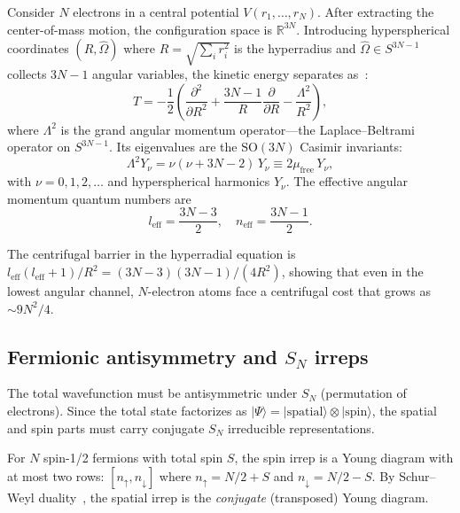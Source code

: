 \documentclass[aps,prl,twocolumn,superscriptaddress,longbibliography]{revtex4-2}
\newcommand{\mufree}{\mu_{\mathrm{free}}}
\newcommand{\neff}{n_{\mathrm{eff}}}
\newcommand{\leff}{l_{\mathrm{eff}}}
\begin{document}
Consider $N$ electrons in a central potential $V(r_1, \ldots, r_N)$.
After extracting the center-of-mass motion, the configuration space is
$\mathbb{R}^{3N}$.  Introducing hyperspherical coordinates
$(R, \hat{\Omega})$ where $R = \sqrt{\sum_i r_i^2}$ is the
hyperradius and $\hat{\Omega} \in S^{3N-1}$ collects $3N-1$ angular
variables, the kinetic energy separates as~\cite{Avery2000,
Fock1954}:
\begin{equation}
  T = -\frac{1}{2}\left(\frac{\partial^2}{\partial R^2}
    + \frac{3N-1}{R}\frac{\partial}{\partial R}
    - \frac{\Lambda^2}{R^2}\right),
  \label{eq:kinetic}
\end{equation}
where $\Lambda^2$ is the grand angular momentum operator---the
Laplace--Beltrami operator on $S^{3N-1}$.  Its eigenvalues are the
$\mathrm{SO}(3N)$ Casimir invariants:
\begin{equation}
  \Lambda^2 Y_\nu = \nu(\nu + 3N - 2)\, Y_\nu \equiv 2\mufree\, Y_\nu,
  \label{eq:casimir}
\end{equation}
with $\nu = 0, 1, 2, \ldots$ and hyperspherical harmonics $Y_\nu$.
The effective angular momentum quantum numbers are
\begin{equation}
  \leff = \frac{3N - 3}{2}, \quad \neff = \frac{3N - 1}{2}.
  \label{eq:eff_qn}
\end{equation}

The centrifugal barrier in the hyperradial equation is
$\leff(\leff + 1)/R^2 = (3N-3)(3N-1)/(4R^2)$, showing that even in
the lowest angular channel, $N$-electron atoms face a centrifugal cost
that grows as $\sim 9N^2/4$.

\subsection{Fermionic antisymmetry and $S_N$ irreps}
\label{sec:sn_irreps}

The total wavefunction must be antisymmetric under $S_N$ (permutation
of electrons).  Since the total state factorizes as $|\Psi\rangle =
|\text{spatial}\rangle \otimes |\text{spin}\rangle$, the spatial and
spin parts must carry conjugate $S_N$ irreducible representations.

For $N$ spin-1/2 fermions with total spin $S$, the spin irrep is a
Young diagram with at most two rows: $[n_\uparrow, n_\downarrow]$
where $n_\uparrow = N/2 + S$ and $n_\downarrow = N/2 - S$.  By
Schur--Weyl duality~\cite{Weyl1946, FultonHarris1991}, the spatial
irrep is the \emph{conjugate} (transposed) Young diagram.
\end{document}
